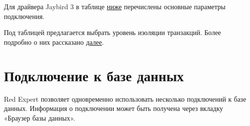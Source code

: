 Для драйвера Jaybird 3 в таблице \hyperlink{tab:01}{ниже} перечислены основные параметры подключения.

Под таблицей предлагается выбрать уровень изоляции транзакций. Более подробно о них рассказано \hyperlink{tab:isollevel}{далее}.

\newpage
\section{Подключение к базе данных}\label{sec:connections}

Red Expert позволяет одновременно использовать несколько подключений к базе данных. Информация о подключении может быть получена через вкладку «Браузер базы данных».


